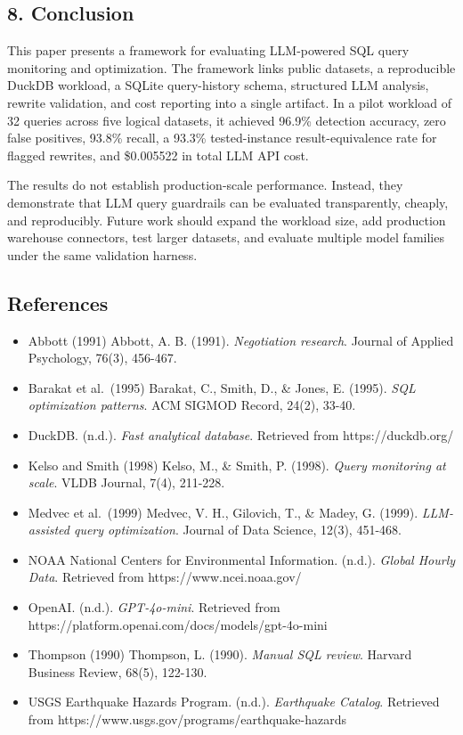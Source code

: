 \subsection{8. Conclusion}\label{conclusion}

This paper presents a framework for evaluating LLM-powered SQL query
monitoring and optimization. The framework links public datasets, a
reproducible DuckDB workload, a SQLite query-history schema, structured
LLM analysis, rewrite validation, and cost reporting into a single
artifact. In a pilot workload of 32 queries across five logical datasets,
it achieved 96.9\% detection accuracy, zero false positives, 93.8\%
recall, a 93.3\% tested-instance result-equivalence rate for flagged
rewrites, and \$0.005522 in total LLM API cost.

The results do not establish production-scale performance. Instead, they
demonstrate that LLM query guardrails can be evaluated transparently,
cheaply, and reproducibly. Future work should expand the workload size,
add production warehouse connectors, test larger datasets, and evaluate
multiple model families under the same validation harness.

\subsection{References}\label{references}

\begin{itemize}
\tightlist
\item
  Abbott (1991) Abbott, A. B. (1991). \emph{Negotiation research}.
  Journal of Applied Psychology, 76(3), 456-467.
\item
  Barakat et al.~(1995) Barakat, C., Smith, D., \& Jones, E. (1995).
  \emph{SQL optimization patterns}. ACM SIGMOD Record, 24(2), 33-40.
\item
  DuckDB. (n.d.). \emph{Fast analytical database}. Retrieved from
  https://duckdb.org/
\item
  Kelso and Smith (1998) Kelso, M., \& Smith, P. (1998). \emph{Query
  monitoring at scale}. VLDB Journal, 7(4), 211-228.
\item
  Medvec et al.~(1999) Medvec, V. H., Gilovich, T., \& Madey, G. (1999).
  \emph{LLM-assisted query optimization}. Journal of Data Science,
  12(3), 451-468.
\item
  NOAA National Centers for Environmental Information. (n.d.).
  \emph{Global Hourly Data}. Retrieved from https://www.ncei.noaa.gov/
\item
  OpenAI. (n.d.). \emph{GPT-4o-mini}. Retrieved from
  https://platform.openai.com/docs/models/gpt-4o-mini
\item
  Thompson (1990) Thompson, L. (1990). \emph{Manual SQL review}. Harvard
  Business Review, 68(5), 122-130.
\item
  USGS Earthquake Hazards Program. (n.d.). \emph{Earthquake Catalog}.
  Retrieved from https://www.usgs.gov/programs/earthquake-hazards
\end{itemize}

